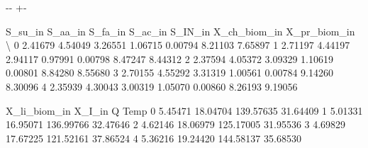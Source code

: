 \documentclass[a4paper,10pt,english]{sphinxmanual}
\newlength\nbsphinxcodecellspacing
\begin{document}
{

\kern-\sphinxverbatimsmallskipamount\kern-\baselineskip
\kern+\FrameHeightAdjust\kern-\fboxrule
\vspace{\nbsphinxcodecellspacing}

\begin{sphinxVerbatim}[commandchars=\\\{\}]
\llap{\color{nbsphinxout}[9]:\,\hspace{\fboxrule}\hspace{\fboxsep}}   S\_su\_in  S\_aa\_in  S\_fa\_in  S\_ac\_in  S\_IN\_in  X\_ch\_biom\_in  X\_pr\_biom\_in  \textbackslash{}
0  2.41679  4.54049  3.26551  1.06715  0.00794       8.21103       7.65897
1  2.71197  4.44197  2.94117  0.97991  0.00798       8.47247       8.44312
2  2.37594  4.05372  3.09329  1.10619  0.00801       8.84280       8.55680
3  2.70155  4.55292  3.31319  1.00561  0.00784       9.14260       8.30096
4  2.35939  4.30043  3.00319  1.05070  0.00860       8.26193       9.19056

   X\_li\_biom\_in    X\_I\_in          Q      Temp
0       5.45471  18.04704  139.57635  31.64409
1       5.01331  16.95071  136.99766  32.47646
2       4.62146  18.06979  125.17005  31.95536
3       4.69829  17.67225  121.52161  37.86524
4       5.36216  19.24420  144.58137  35.68530
\end{sphinxVerbatim}
}

{
\begin{sphinxVerbatim}[commandchars=\\\{\}]
\llap{\color{nbsphinxin}[10]:\,\hspace{\fboxrule}\hspace{\fboxsep}}
\PYG{p}{[}\PYG{p}{]} 
\end{sphinxVerbatim}
}
\end{document}
